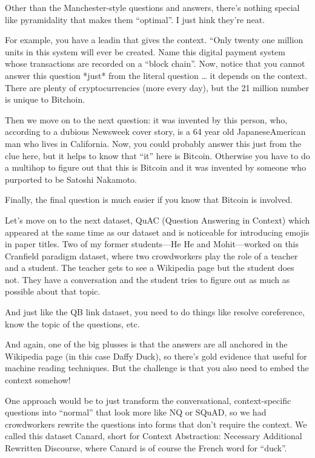 Other than the Manchester-style questions and answers, there’s nothing special like pyramidality that makes them “optimal”.  I just hink they’re neat.

For example, you have a leadin that gives the context.  “Only twenty­ one million units in this system will ever be created. Name this digital payment system whose transactions are recorded on a “block chain”. Now, notice that you cannot answer this question *just* from the literal question … it depends on the context.  There are plenty of cryptocurrencies (more every day), but the 21 million number is unique to Bitchoin.

Then we move on to the next question: it was invented by this person, who, according to a dubious Newsweek cover story, is a 64­ year ­old Japanese­American man who lives in California.  Now, you could probably answer this just from the clue here, but it helps to know that “it” here is Bitcoin.  Otherwise you have to do a multihop to figure out that this is Bitcoin and it was invented by someone who purported to be Satoshi Nakamoto.

Finally, the final question is much easier if you know that Bitcoin is involved.

Let’s move on to the next dataset, QuAC (Question Answering in Context) which appeared at the same time as our dataset and is noticeable for introducing emojis in paper titles.  Two of my former students—He He and Mohit—worked on this Cranfield paradigm dataset, where two crowdworkers play the role of a teacher and a student.  The teacher gets to see a Wikipedia page but the student does not.  They have a conversation and the student tries to figure out as much as possible about that topic.  

And just like the QB link dataset, you need to do things like resolve coreference, know the topic of the questions, etc.

And again, one of the big plusses is that the answers are all anchored in the Wikipedia page (in this case Daffy Duck), so there’s gold evidence that useful for machine reading techniques.  But the challenge is that you also need to embed the context somehow!

One approach would be to just transform the conversational, context-specific questions into “normal” that look more like NQ or SQuAD, so we had crowdworkers rewrite the questions into forms that don’t require the context.  We called this dataset Canard, short for Context Abstraction: Necessary Additional Rewritten Discourse, where Canard is of course the French word for “duck”.

